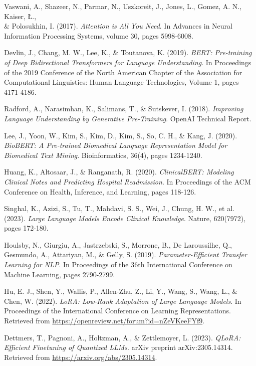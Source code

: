 \begin{thebibliography}{99}

 Vaswani, A., Shazeer, N., Parmar, N., Uszkoreit, J., Jones, L., Gomez, A. N., Kaiser, Ł., \\& Polosukhin, I. (2017). \textit{Attention is All You Need}. In Advances in Neural Information Processing Systems, volume 30, pages 5998-6008.

 Devlin, J., Chang, M. W., Lee, K., \& Toutanova, K. (2019). \textit{BERT: Pre-training of Deep Bidirectional Transformers for Language Understanding}. In Proceedings of the 2019 Conference of the North American Chapter of the Association for Computational Linguistics: Human Language Technologies, Volume 1, pages 4171-4186.

 Radford, A., Narasimhan, K., Salimans, T., \& Sutskever, I. (2018). \textit{Improving Language Understanding by Generative Pre-Training}. OpenAI Technical Report.

 Lee, J., Yoon, W., Kim, S., Kim, D., Kim, S., So, C. H., \& Kang, J. (2020). \textit{BioBERT: A Pre-trained Biomedical Language Representation Model for Biomedical Text Mining}. Bioinformatics, 36(4), pages 1234-1240.

 Huang, K., Altosaar, J., \& Ranganath, R. (2020). \textit{ClinicalBERT: Modeling Clinical Notes and Predicting Hospital Readmission}. In Proceedings of the ACM Conference on Health, Inference, and Learning, pages 118-126.

 Singhal, K., Azizi, S., Tu, T., Mahdavi, S. S., Wei, J., Chung, H. W., et al. (2023). \textit{Large Language Models Encode Clinical Knowledge}. Nature, 620(7972), pages 172-180.

 Houlsby, N., Giurgiu, A., Jastrzebski, S., Morrone, B., De Laroussilhe, Q., Gesmundo, A., Attariyan, M., \& Gelly, S. (2019). \textit{Parameter-Efficient Transfer Learning for NLP}. In Proceedings of the 36th International Conference on Machine Learning, pages 2790-2799.

 Hu, E. J., Shen, Y., Wallis, P., Allen-Zhu, Z., Li, Y., Wang, S., Wang, L., \& Chen, W. (2022). \textit{LoRA: Low-Rank Adaptation of Large Language Models}. In Proceedings of the International Conference on Learning Representations. Retrieved from \url{https://openreview.net/forum?id=nZeVKeeFYf9}.

 Dettmers, T., Pagnoni, A., Holtzman, A., \& Zettlemoyer, L. (2023). \textit{QLoRA: Efficient Finetuning of Quantized LLMs}. arXiv preprint arXiv:2305.14314. Retrieved from \url{https://arxiv.org/abs/2305.14314}.


\end{thebibliography}
